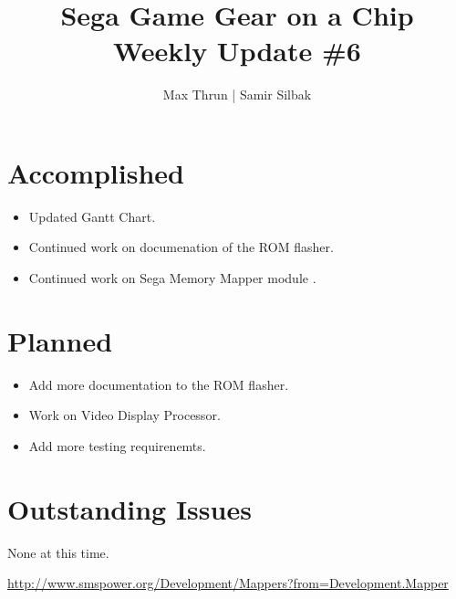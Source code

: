 \documentclass[12pt]{article}
\title{Sega Game Gear on a Chip \\ Weekly Update \#6}
\author{ Max Thrun | Samir Silbak }
\begin{document}
\maketitle

\section*{Accomplished}
\begin{itemize}
    \item Updated Gantt Chart.
    \item Continued work on documenation of the ROM flasher.
    \item Continued work on Sega Memory Mapper module \cite{mapper} .
\end{itemize}

\section*{Planned}
\begin{itemize}
    \item Add more documentation to the ROM flasher.
    \item Work on Video Display Processor.
    \item Add more testing requirenemts.
\end{itemize}

\section*{Outstanding Issues}
None at this time.

\vspace{.1in}
\begin{thebibliography}{9}
     \url{http://www.smspower.org/Development/Mappers?from=Development.Mapper}
\end{thebibliography}
\end{document}
